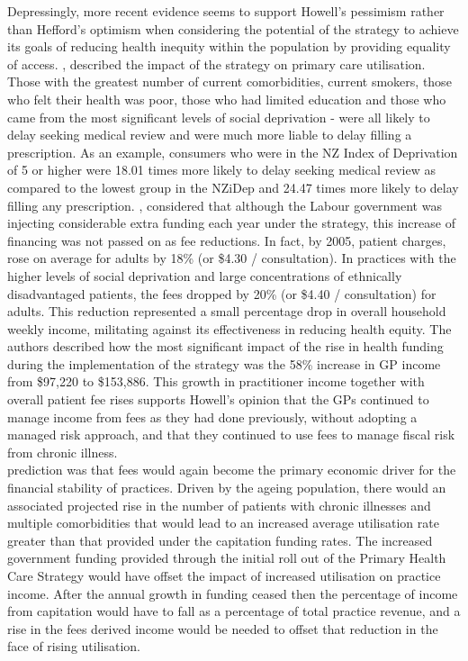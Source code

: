 \documentclass[11pt,a4paper]{article}
\begin{document}
Depressingly, more recent evidence seems to support Howell's pessimism rather than Hefford's optimism when considering the potential of the strategy to achieve its goals of reducing health inequity within the population by providing equality of access. \citet{jatrana2009primary}, described the impact of the strategy on primary care utilisation. Those with the greatest number of current comorbidities, current smokers, those who felt their health was poor, those who had limited education and those who came from the most significant levels of social deprivation - were all likely to delay seeking medical review and were much more liable to delay filling a prescription.  As an example, consumers who were in the NZ Index of Deprivation of 5 or higher were 18.01 times more likely to delay seeking medical review as compared to the lowest group in the NZiDep and 24.47 times more likely to delay filling any prescription. \citet{cumming2008reforming}, considered  that although the Labour government was injecting considerable extra funding each year under the strategy, this increase of financing was not passed on as fee reductions.  In fact, by 2005, patient charges, rose on average for adults by 18\% (or \$4.30 / consultation). In practices with the higher levels of social deprivation and large concentrations of ethnically disadvantaged patients, the fees dropped by 20\% (or \$4.40 / consultation) for adults. This reduction represented a small percentage drop in overall household weekly income, militating against its effectiveness in reducing health equity.  The authors described how the most significant impact of the rise in health funding during the implementation of the strategy was the 58\% increase in GP income from \$97,220 to \$153,886. This growth in practitioner income together with overall patient fee rises supports Howell's opinion that the GPs continued to manage income from fees as they had done previously, without adopting a managed risk approach, and that they continued to use fees to manage fiscal risk from chronic illness. \\

\citet{howell2005restructuring} prediction was that fees would again become the primary economic driver for the financial stability of practices. Driven by the ageing  population, there would an associated projected rise in the number of patients with chronic illnesses and multiple comorbidities that would lead to an increased  average utilisation rate greater than that provided under the capitation funding rates. The increased government funding provided through the initial roll out of the Primary Health Care Strategy would have offset the impact of increased utilisation on practice income. After the annual growth in funding ceased then the percentage of income from capitation would have to fall as a percentage of total practice revenue, and a rise in the fees derived income would be needed to offset that reduction in the face of rising utilisation.\\
\end{document}
